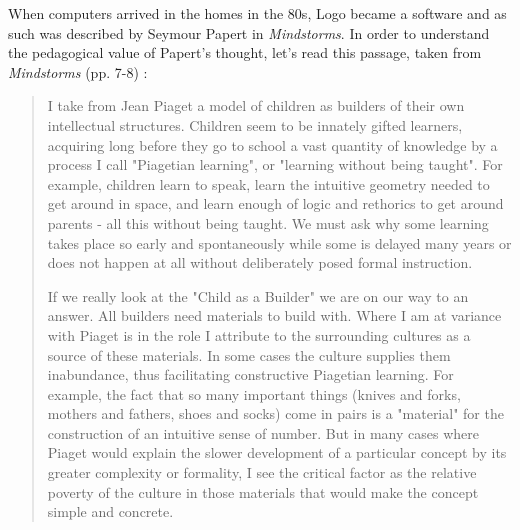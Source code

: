When computers arrived in the homes in the 80s, Logo became a software and as such was described by Seymour Papert in  \textit{Mindstorms}. In order to understand the pedagogical value of Papert's thought, let's read this passage, taken from  \textit{Mindstorms} (pp. 7-8) \cite{Papert}:

\begin{quote} 
I take from Jean Piaget a model of children as builders of their own intellectual structures. Children seem to be innately gifted learners, acquiring long before they go to school a vast quantity of knowledge by a process I call "Piagetian learning", or "learning without being taught". For example, children learn to speak, learn the intuitive geometry needed to get around in space, and learn enough of logic and rethorics to get around parents - all this without being taught. We must ask why some learning takes place so early and spontaneously while some is delayed many years or does not happen at all without deliberately posed formal instruction. 

If we really look at the "Child as a Builder" we are on our way to an answer. All builders need materials to build with. Where I am at variance with Piaget is in the role I attribute to the surrounding cultures as a source of these materials. In some cases the culture supplies them inabundance, thus facilitating constructive Piagetian learning. For example, the fact that so many important things (knives and forks, mothers and fathers, shoes and socks) come in pairs is a "material" for the construction of an intuitive sense of number. But in many cases where Piaget would explain the slower development of a particular concept by its greater complexity or formality, I see the critical factor as the relative poverty of the culture in those materials that would make the concept simple and concrete.
\end{quote}


